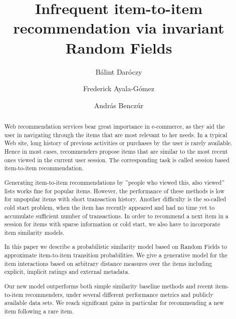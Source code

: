 \documentclass[sigconf]{acmart}
\begin{document}
\title{Infrequent item-to-item recommendation via invariant Random Fields}

\author{B\'alint Dar\'oczy}

\author{Frederick Ayala-G\'omez}

\author{Andr\'{a}s Bencz\'{u}r}



\begin{abstract}
Web recommendation services bear great importance in e-commerce, as they aid the user in navigating through the items that are most relevant to her needs. In a typical Web site, long history of previous activities or purchases by the user is rarely available. Hence in most cases, recommenders propose items that are similar to the most recent ones viewed in the current user session. The corresponding task is called session based item-to-item recommendation.

Generating item-to-item recommendations by ''people who viewed this, also viewed'' lists works fine for popular items. However, the performance of these methods is low for unpopular items with short transaction history. Another difficulty is the so-called cold start problem, when the item has recently appeared and had no time yet to accumulate sufficient number of transactions. In order to recommend a next item in a session for items with sparse information or cold start, we also have to incorporate item similarity models.

In this paper we describe a probabilistic similarity model based on Random Fields to approximate item-to-item transition probabilities. We give a generative model for the item interactions based on arbitrary distance measures over the items including explicit, implicit ratings and external metadata.

Our new model outperforms both simple similarity baseline methods and recent item-to-item recommenders, under several different performance metrics and publicly available data sets. We reach significant gains in particular for recommending a new item following a rare item.

\end{abstract}
\end{document}
